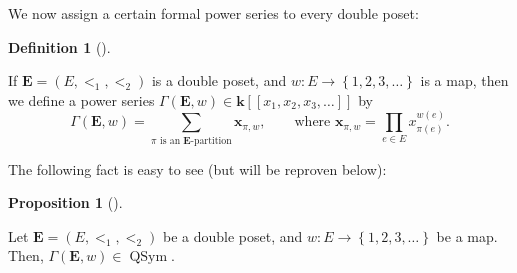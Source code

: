 \documentclass[numbers=enddot,12pt,final,onecolumn,notitlepage,abstracton]{scrartcl}%
\theoremstyle{definition}
\newtheorem{prop}[theo]{Proposition}
\newenvironment{proposition}[1][]
{\begin{prop}[#1]\begin{leftbar}}
{\end{leftbar}\end{prop}}
\newtheorem{defi}[theo]{Definition}
\newenvironment{definition}[1][]
{\begin{defi}[#1]\begin{leftbar}}
{\end{leftbar}\end{defi}}
\let\sumnonlimits\sum
\let\prodnonlimits\prod
\renewcommand{\sum}{\sumnonlimits\limits}
\renewcommand{\prod}{\prodnonlimits\limits}
\newcommand{\xx}{{\mathbf{x}}}
\newcommand{\QSym}{{\operatorname{QSym}}}
\newcommand{\Powser}{\mathbf{k}\left[\left[x_1,x_2,x_3,\ldots\right]\right]}
\newcommand{\EE}{{\mathbf{E}}}
\begin{document}

We now assign a certain formal power series to every double poset:

\begin{definition}
\label{def.Gammaw}
If $\EE = \left(E, <_1, <_2\right)$ is a double poset, and
$w : E \to \left\{1, 2, 3, \ldots\right\}$ is a map, then we define
a power series $\Gamma\left(\EE , w\right) \in \Powser$ by
\[
\Gamma\left(\EE , w\right)
= \sum_{\pi\text{ is an }\EE\text{-partition}}
  \xx_{\pi, w} ,
\qquad
\text{where } \xx_{\pi, w}
= \prod_{e \in E} x_{\pi\left(e\right)}^{w\left(e\right)} .
\]
\end{definition}

The following fact is easy to see (but will be reproven below):

\begin{proposition}
\label{prop.Gammaw.qsym}
Let $\EE = \left(E, <_1, <_2\right)$ be a double poset, and
$w : E \to \left\{1, 2, 3, \ldots\right\}$ be a map. Then,
$\Gamma\left(\EE , w\right) \in \QSym$.
\end{proposition}
\end{document}
